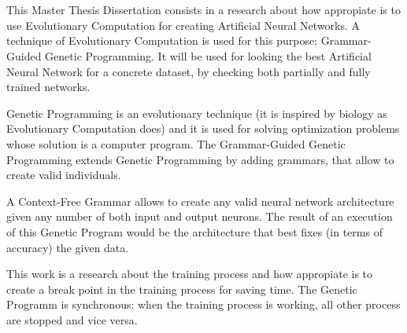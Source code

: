 \documentclass[spanish,a4paper,12pt,twoside]{report}
\begin{document}
  \chapter*{\vspace{-3cm}{\LARGE Summary}}
  \vspace{-1cm}
  This Master Thesis Dissertation consists in a research about how appropiate is to use Evolutionary Computation for creating Artificial Neural Networks. A technique of Evolutionary Computation is used for this purpose; Grammar-Guided Genetic Programming. It will be used for looking the best Artificial Neural Network for a concrete dataset, by checking both partially and fully trained networks. \par
  Genetic Programming is an evolutionary technique (it is inspired by biology as Evolutionary Computation does) and it is used for solving optimization problems whose solution is a computer program. The Grammar-Guided Genetic Programming extends Genetic Programming by adding grammars, that allow to create valid individuals. \par
  A Context-Free Grammar allows to create any valid neural network architecture given any number of both input and output neurons. The result of an execution of this Genetic Program would be the architecture that best fixes (in terms of accuracy) the given data. \par
  This work is a research about the training process and how appropiate is to create a break point in the training process for saving time. The Genetic Programm is synchronous: when the training process is working, all other process are stopped and vice versa.
  \vfill
  \newpage\cleardoublepage
  
  \renewcommand{\baselinestretch}{0.35}\normalsize
  \tableofcontents
  \renewcommand{\baselinestretch}{1.0}\normalsize
  \listoffigures
  \newpage
  \renewcommand{\listtablename}{Índice de tablas}
  \listoftables
  
  \newpage\cleardoublepage
  
\end{document}
